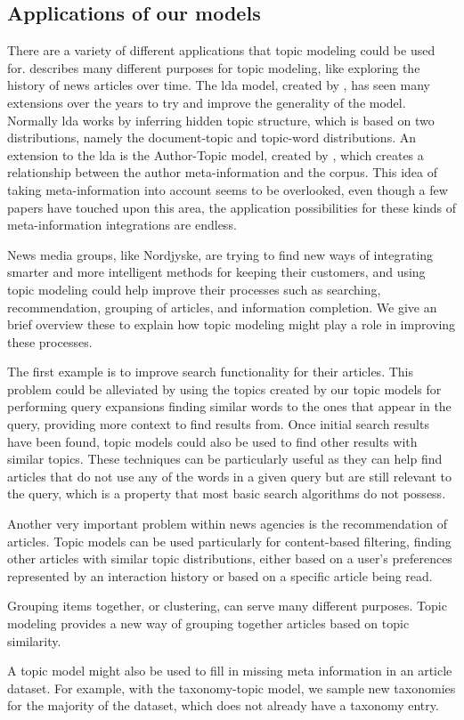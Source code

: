 \subsection{Applications of our models}\label{sec:appendix_applications}
There are a variety of different applications that topic modeling could be used for. 
\citet{Probabilistic_Topic_Models} describes many different purposes for topic modeling, like exploring the history of news articles over time.
The \gls{lda} model, created by \citet{blei2003latent}, has seen many extensions over the years to try and improve the generality of the model.
Normally \gls{lda} works by inferring hidden topic structure, which is based on two distributions, namely the document-topic and topic-word distributions.
An extension to the \gls{lda} is the Author-Topic model, created by \citet{author_topic_2012}, which creates a relationship between the author meta-information and the corpus.
This idea of taking meta-information into account seems to be overlooked, even though a few papers have touched upon this area, the application possibilities for these kinds of meta-information integrations are endless.

News media groups, like Nordjyske, are trying to find new ways of integrating smarter and more intelligent methods for keeping their customers, and using topic modeling could help improve their processes such as searching, recommendation, grouping of articles, and information completion.
We give an brief overview these to explain how topic modeling might play a role in improving these processes.

The first example is to improve search functionality for their articles.
This problem could be alleviated by using the topics created by our topic models for performing query expansions finding similar words to the ones that appear in the query, providing more context to find results from.
Once initial search results have been found, topic models could also be used to find other results with similar topics.
These techniques can be particularly useful as they can help find articles that do not use any of the words in a given query but are still relevant to the query, which is a property that most basic search algorithms do not possess.

Another very important problem within news agencies is the recommendation of articles.
Topic models can be used particularly for content-based filtering, finding other articles with similar topic distributions, either based on a user's preferences represented by an interaction history or based on a specific article being read.

Grouping items together, or clustering, can serve many different purposes. 
Topic modeling provides a new way of grouping together articles based on topic similarity.

A topic model might also be used to fill in missing meta information in an article dataset.
For example, with the taxonomy-topic model, we sample new taxonomies for the majority of the dataset, which does not already have a taxonomy entry.
